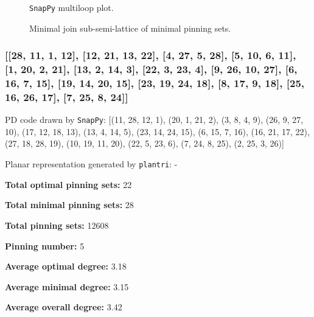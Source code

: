 \documentclass{article}%
\begin{document}
\begin{multicols}{2}
\begin{figure}[H]
\centering

\caption{\texttt{SnapPy} multiloop plot.}
\label{fig:tex/img/[[24, 19, 1, 20], [20, 11, 21, 12], [8, 23, 9, 24], [9, 18, 10, 19], [1, 10, 2, 11], [21, 17, 22, 16], [12, 25, 13, 28], [7, 27, 8, 28], [22, 3, 23, 4], [17, 2, 18, 3], [4, 15, 5, 16], [25, 5, 26, 6],.svg}
\end{figure}
\columnbreak

\begin{figure}[H]
\centering
\scalebox{0.8}{}
\caption{Minimal join sub-semi-lattice of minimal pinning sets.}
\label{fig:tex/img/[[24, 19, 1, 20], [20, 11, 21, 12], [8, 23, 9, 24], [9, 18, 10, 19], [1, 10, 2, 11], [21, 17, 22, 16], [12, 25, 13, 28], [7, 27, 8, 28], [22, 3, 23, 4], [17, 2, 18, 3], [4, 15, 5, 16], [25, 5, 26, 6],.pgf}
\end{figure}
\end{multicols}

\newpage

\subsubsection{[[28, 11, 1, 12], [12, 21, 13, 22], [4, 27, 5, 28], [5, 10, 6, 11], [1, 20, 2, 21], [13, 2, 14, 3], [22, 3, 23, 4], [9, 26, 10, 27], [6, 16, 7, 15], [19, 14, 20, 15], [23, 19, 24, 18], [8, 17, 9, 18], [25, 16, 26, 17], [7, 25, 8, 24]]}

{\small\noindent PD code drawn by \texttt{SnapPy}: [(11, 28, 12, 1), (20, 1, 21, 2), (3, 8, 4, 9), (26, 9, 27, 10), (17, 12, 18, 13), (13, 4, 14, 5), (23, 14, 24, 15), (6, 15, 7, 16), (16, 21, 17, 22), (27, 18, 28, 19), (10, 19, 11, 20), (22, 5, 23, 6), (7, 24, 8, 25), (2, 25, 3, 26)]}

{\small\noindent Planar representation generated by \texttt{plantri}: -}

\begin{multicols}{2}
{\normalsize \noindent\textbf{Total optimal pinning sets:} 22

\noindent\textbf{Total minimal pinning sets:} 28

\noindent\textbf{Total pinning sets:} 12608

\noindent\textbf{Pinning number:} 5

}
\columnbreak

{\normalsize \noindent\textbf{Average optimal degree:} 3.18

\noindent\textbf{Average minimal degree:} 3.15

\noindent\textbf{Average overall degree:} 3.42

}
\end{multicols}
\end{document}

